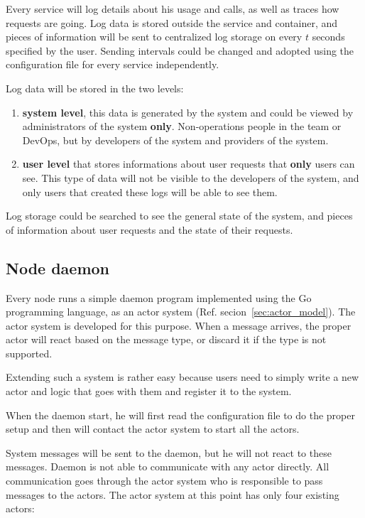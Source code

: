 Every service will log details about his usage and calls, as well as traces how requests are going. Log data is stored outside the service and container, and pieces of information will be sent to centralized log storage on every $t$ seconds specified by the user. Sending intervals could be changed and adopted using the configuration file for every service independently.

Log data will be stored in the two levels:

\begin{enumerate}[start=1,label={(\bfseries \arabic*)}]
	\item \textbf{system level}, this data is generated by the system and could be viewed by administrators of the system \textbf{only}. Non-operations people in the team or DevOps, but by developers of the system and providers of the system.
	\item \textbf{user level} that stores informations about user requests that \textbf{only} users can see. This type of data will not be visible to the developers of the system, and only users that created these logs will be able to see them.
\end{enumerate}

\noindent
Log storage could be searched to see the general state of the system, and pieces of information about user requests and the state of their requests.
%
%
\subsection{Node daemon}\label{sec:node_daemon}
%
Every node runs a simple daemon program implemented using the Go programming language, as an actor system (Ref. secion~\ref{sec:actor_model}). The actor system is developed for this purpose. When a message arrives, the proper actor will react based on the message type, or discard it if the type is not supported. 

Extending such a system is rather easy because users need to simply write a new actor and logic that goes with them and register it to the system.

When the daemon start, he will first read the configuration file to do the proper setup and then will contact the actor system to start all the actors. 

System messages will be sent to the daemon, but he will not react to these messages. Daemon is not able to communicate with any actor directly. All communication goes through the actor system who is responsible to pass messages to the actors. The actor system at this point has only four existing actors:

